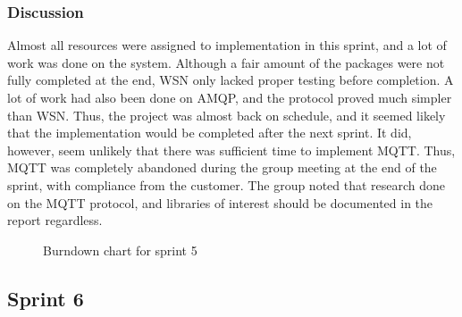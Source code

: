 \subsubsection{Discussion}
\label{subsec:project_lifecycle-development-sprint_5-discussion}

Almost all resources were assigned to implementation in this sprint, and a lot of work was done on the system. Although a fair amount of the packages were not fully completed at the end, WSN only lacked proper testing before completion. A lot of work had also been done on AMQP, and the protocol proved much simpler than WSN. Thus, the project was almost back on schedule, and it seemed likely that the implementation would be completed after the next sprint. It did, however, seem unlikely that there was sufficient time to implement MQTT. Thus, MQTT was completely abandoned during the group meeting at the end of the sprint, with compliance from the customer. The group noted that research done on the MQTT protocol, and libraries of interest should be documented in the report regardless.

\begin{center}
  \begin{figure}[ht!]
    \caption{Burndown chart for sprint 5}
    \label{fig:sprint 5, burndown}
  \end{figure}
\end{center}

\subsection{Sprint 6}
\label{subsec:project_lifecycle-development-sprint_6}

